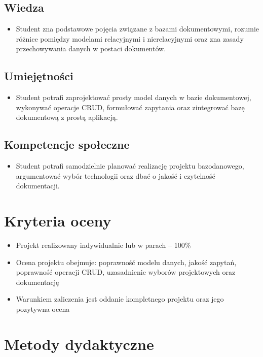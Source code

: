 \documentclass[12pt, a4paper]{article}
\begin{document}
\subsection*{Wiedza}
\begin{itemize}
  \item Student zna podstawowe pojęcia związane z bazami dokumentowymi, rozumie różnice pomiędzy modelami relacyjnymi i nierelacyjnymi oraz zna zasady przechowywania danych w postaci dokumentów.
\end{itemize}

\subsection*{Umiejętności}
\begin{itemize}
  \item Student potrafi zaprojektować prosty model danych w bazie dokumentowej, wykonywać operacje CRUD, formułować zapytania oraz zintegrować bazę dokumentową z prostą aplikacją.
\end{itemize}

\subsection*{Kompetencje społeczne}
\begin{itemize}
  \item Student potrafi samodzielnie planować realizację projektu bazodanowego, argumentować wybór technologii oraz dbać o jakość i czytelność dokumentacji.
\end{itemize}

\section{Kryteria oceny}

\begin{itemize}
  \item Projekt realizowany indywidualnie lub w parach – 100\%
  \item Ocena projektu obejmuje: poprawność modelu danych, jakość zapytań, poprawność operacji CRUD, uzasadnienie wyborów projektowych oraz dokumentację
  \item Warunkiem zaliczenia jest oddanie kompletnego projektu oraz jego pozytywna ocena
\end{itemize}

\section{Metody dydaktyczne}
\end{document}
